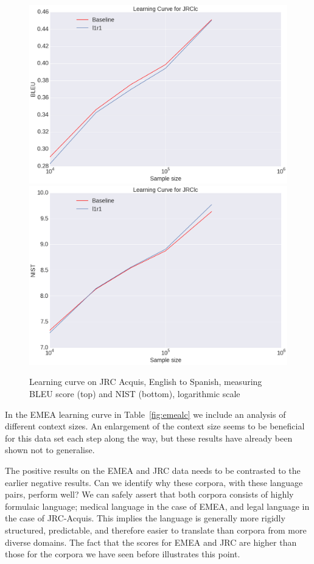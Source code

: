 \documentclass[smallextended]{svjour3}       %
\theoremstyle{break}
\begin{document}
\begin{figure}
\includegraphics[width=120.00mm]{jrclcbleu.png}
\includegraphics[width=120.00mm]{jrclcnist.png}
\caption{Learning curve on JRC Acquis, English to Spanish, measuring BLEU score (top) and NIST (bottom), logarithmic scale}
\label{fig:jrclc}
\end{figure}


In the EMEA learning curve in Table~\ref{fig:emealc} we include an analysis
of different context sizes.  An enlargement of the context size seems to be
beneficial for this data set each step along the way, but these results have
already been shown not to generalise.

The positive results on the EMEA and JRC data needs to be
contrasted to the earlier negative results. Can we identify why these
corpora, with these language pairs, perform well? We can safely assert
that both corpora consists of highly formulaic language; medical language in the
case of EMEA, and legal language in the case of JRC-Acquis.  This
implies the language is generally more rigidly structured,
predictable, and therefore easier to translate than corpora from more
diverse domains. The fact that the scores for EMEA and JRC are higher
than those for the corpora we have seen before illustrates this
point.
\end{document}
